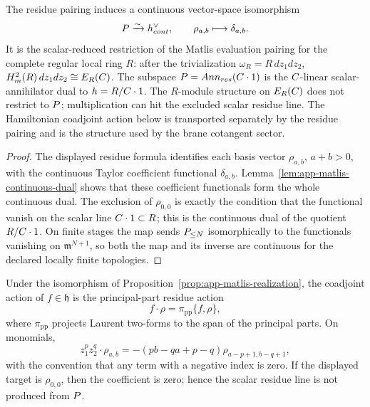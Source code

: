 \begin{prop}
\label{prop:app-matlis-realization}
  The residue pairing induces a continuous vector-space isomorphism
  \[
    P\xrightarrow{\sim}h^\vee_{cont},
    \qquad
    \rho_{a,b}\longmapsto\delta_{a,b}.
  \]
  It is the scalar-reduced restriction of the Matlis evaluation
  pairing for the complete regular local ring \(R\): after the
  trivialization \(\omega_R=R\,dz_1dz_2\),
  \(H^2_{m}(R)\,dz_1dz_2\cong E_R(C)\).  The subspace
  \(P=Ann_{res}(C\cdot1)\) is the
  \(C\)-linear scalar-annihilator dual to
  \(h=R/C\cdot1\).  The \(R\)-module structure on
  \(E_R(C)\) does not restrict to \(P\); multiplication can hit the
  excluded scalar residue line.  The Hamiltonian coadjoint action below
  is transported separately by the residue pairing and is the structure
  used by the brane cotangent sector.
\end{prop}

\begin{proof}
  The displayed residue formula identifies each basis vector
  \(\rho_{a,b}\), \(a+b>0\), with the continuous Taylor coefficient
  functional \(\delta_{a,b}\).  Lemma~\ref{lem:app-matlis-continuous-dual}
  shows that these coefficient functionals form the whole continuous
  dual.  The exclusion of \(\rho_{0,0}\) is exactly the condition that
  the functional vanish on the scalar line \(C\cdot1\subset R\); this is
  the continuous dual of the quotient \(R/C\cdot1\).  On finite stages
  the map sends \(P_{\leq N}\) isomorphically to the functionals
  vanishing on \(\mathfrak m^{N+1}\), so both the map and its inverse are
  continuous for the declared locally finite topologies.
\end{proof}

\begin{prop}
\label{prop:app-matlis-coadjoint-action}
  Under the isomorphism of
  Proposition~\ref{prop:app-matlis-realization}, the coadjoint action
  of \(f\in\mathfrak h\) is the principal-part residue action
  \[
    f\cdot\rho=\pi_{\mathrm{pp}}\{f,\rho\},
  \]
  where \(\pi_{\mathrm{pp}}\) projects Laurent two-forms to the span
  of the principal parts.  On monomials,
  \[
    z_1^p z_2^q\cdot\rho_{a,b}
      =-(pb-qa+p-q)\rho_{a-p+1,b-q+1},
  \]
  with the convention that any term with a negative index is zero.  If the
  displayed target is \(\rho_{0,0}\), then the coefficient is zero; hence
  the scalar residue line is not produced from \(P\).
\end{prop}

